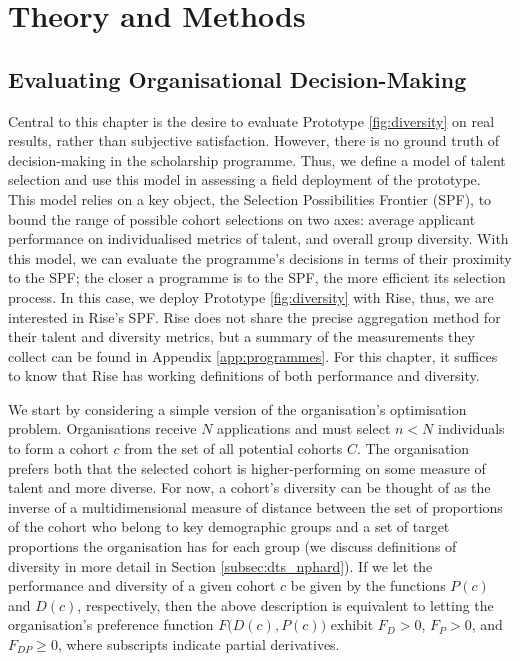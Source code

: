 \section{Theory and Methods}\label{sec:spfmethod}
\subsection{Evaluating Organisational Decision-Making}\label{ssec:measurement}
Central to this chapter is the desire to evaluate Prototype \ref{fig:diversity} on real results, rather than subjective satisfaction. However, there is no ground truth of decision-making in the scholarship programme. Thus, we define a model of talent selection and use this model in assessing a field deployment of the prototype. This model relies on a key object, the Selection Possibilities Frontier (SPF), to bound the range of possible cohort selections on two axes: average applicant performance on individualised metrics of talent, and overall group diversity. With this model, we can evaluate the programme's decisions in terms of their proximity to the SPF; the closer a programme is to the SPF, the more efficient its selection process. In this case, we deploy Prototype \ref{fig:diversity} with Rise, thus, we are interested in Rise's SPF. Rise does not share the precise aggregation method for their talent and diversity metrics, but a summary of the measurements they collect can be found in Appendix \ref{app:programmes}. For this chapter, it suffices to know that Rise has working definitions of both performance and diversity.

We start by considering a simple version of the organisation's optimisation problem. Organisations receive $N$ applications and must select $n<N$ individuals to form a cohort $c$ from the set of all potential cohorts $C$. The organisation prefers both that the selected cohort is higher-performing on some measure of talent and more diverse. For now, a cohort's diversity can be thought of as the inverse of a multidimensional measure of distance between the set of proportions of the cohort who belong to key demographic groups and a set of target proportions the organisation has for each group (we discuss definitions of diversity in more detail in Section \ref{subsec:dts_nphard}). If we let the performance and diversity of a given cohort $c$ be given by the functions $P(c)$ and $D(c)$, respectively, then the above description is equivalent to letting the organisation's preference function $F\Big(D(c),P(c)\Big)$ exhibit $F_D>0$, $F_P>0$, and $F_{DP}\geq0$, where subscripts indicate partial derivatives. 

